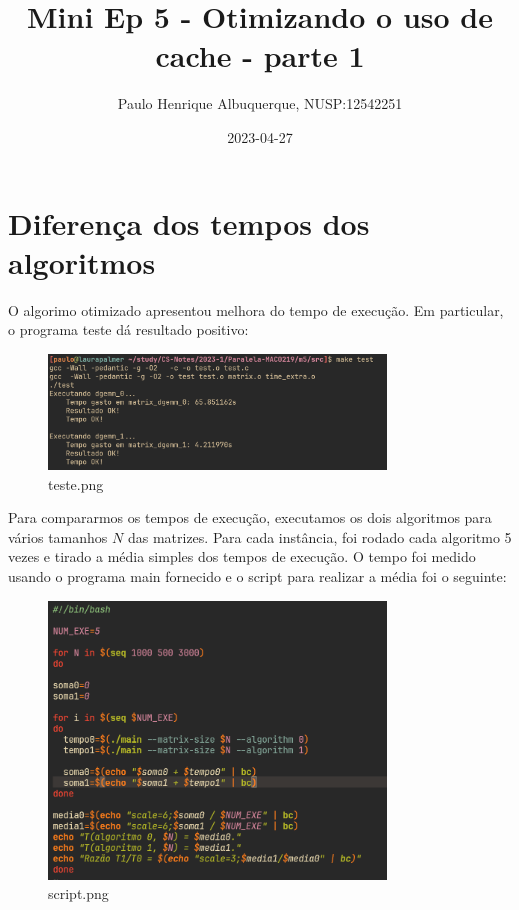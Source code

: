 \documentclass{article}
\title{Mini Ep 5 - Otimizando o uso de cache - parte 1}
\author{Paulo Henrique Albuquerque, NUSP:12542251}
\date{2023-04-27}
\begin{document}
\maketitle

\section{Diferença dos tempos dos algoritmos}

O algorimo otimizado apresentou melhora do tempo de execução. Em particular, o programa teste dá resultado positivo:

\begin{figure}[htpb]
  \centering
  \includegraphics[width=0.8\textwidth]{teste.png}
  \caption{teste.png}
  \label{fig:teste-png}
\end{figure}

Para compararmos os tempos de execução, executamos os dois algoritmos para vários tamanhos $N$ das matrizes. Para cada instância, foi rodado cada algoritmo 5 vezes e tirado a média simples dos tempos de execução. O tempo foi medido usando o programa main fornecido e o script para realizar a média foi o seguinte:

\begin{figure}[htpb]
  \centering
  \includegraphics[width=0.8\textwidth]{script.png}
  \caption{script.png}
  \label{fig:script-png}
\end{figure}
\end{document}

